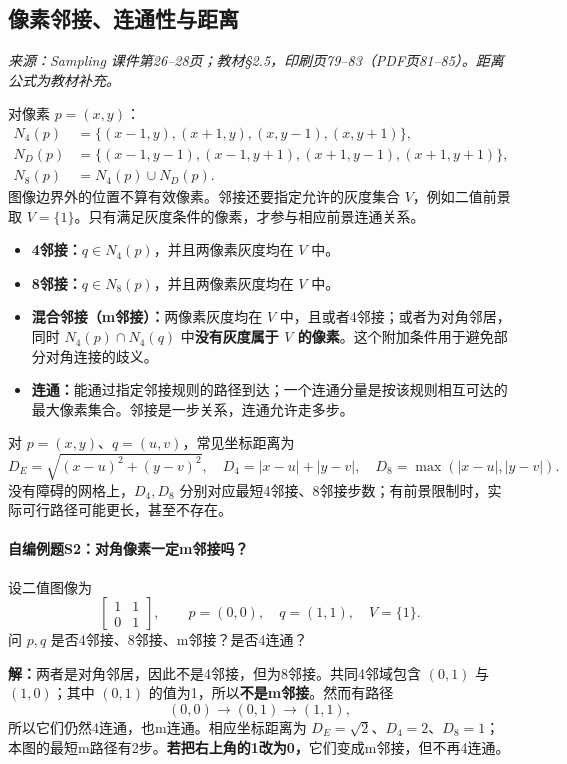 \clearpage
\subsection{像素邻接、连通性与距离}
\textit{来源：Sampling 课件第26--28页；教材\S2.5，印刷页79--83（PDF页81--85）。距离公式为教材补充。}

对像素 $p=(x,y)$：
\[
\begin{aligned}
N_4(p)&=\{(x-1,y),(x+1,y),(x,y-1),(x,y+1)\},\\
N_D(p)&=\{(x-1,y-1),(x-1,y+1),(x+1,y-1),(x+1,y+1)\},\\
N_8(p)&=N_4(p)\cup N_D(p).
\end{aligned}
\]
图像边界外的位置不算有效像素。邻接还要指定允许的灰度集合 $V$，例如二值前景取 $V=\{1\}$。只有满足灰度条件的像素，才参与相应前景连通关系。
\begin{itemize}
\item \textbf{4邻接：}$q\in N_4(p)$，并且两像素灰度均在 $V$ 中。
\item \textbf{8邻接：}$q\in N_8(p)$，并且两像素灰度均在 $V$ 中。
\item \textbf{混合邻接（m邻接）：}两像素灰度均在 $V$ 中，且或者4邻接；或者为对角邻居，同时 $N_4(p)\cap N_4(q)$ 中\textbf{没有灰度属于 $V$ 的像素}。这个附加条件用于避免部分对角连接的歧义。
\item \textbf{连通：}能通过指定邻接规则的路径到达；一个连通分量是按该规则相互可达的最大像素集合。邻接是一步关系，连通允许走多步。
\end{itemize}
对 $p=(x,y)$、$q=(u,v)$，常见坐标距离为
\[
D_E=\sqrt{(x-u)^2+(y-v)^2},\quad
D_4=|x-u|+|y-v|,\quad
D_8=\max(|x-u|,|y-v|).
\]
没有障碍的网格上，$D_4,D_8$ 分别对应最短4邻接、8邻接步数；有前景限制时，实际可行路径可能更长，甚至不存在。

\paragraph{自编例题S2：对角像素一定m邻接吗？}
设二值图像为
\[
\begin{bmatrix}1&1\\0&1\end{bmatrix},\qquad
p=(0,0),\quad q=(1,1),\quad V=\{1\}.
\]
问 $p,q$ 是否4邻接、8邻接、m邻接？是否4连通？

\textbf{解：}两者是对角邻居，因此不是4邻接，但为8邻接。共同4邻域包含 $(0,1)$ 与 $(1,0)$；其中 $(0,1)$ 的值为1，所以\textbf{不是m邻接}。然而有路径
\[
(0,0)\longrightarrow(0,1)\longrightarrow(1,1),
\]
所以它们仍然4连通，也m连通。相应坐标距离为 $D_E=\sqrt2$、$D_4=2$、$D_8=1$；本图的最短m路径有2步。\textbf{若把右上角的1改为0，}它们变成m邻接，但不再4连通。

